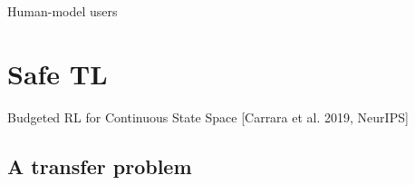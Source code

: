 \documentclass{beamer}
\begin{document}
    \begin{frame}{Human-model users}
        \begin{figure}
            \captionsetup[subfigure]{labelformat=empty}
            \begin{center}
            \end{center}
        \end{figure}
    \end{frame}




    \section{Safe TL}

    \begin{frame}
        Budgeted RL for Continuous State Space
        [Carrara et al. 2019, NeurIPS]
    \end{frame}

    \subsection{A transfer problem}
\end{document}
